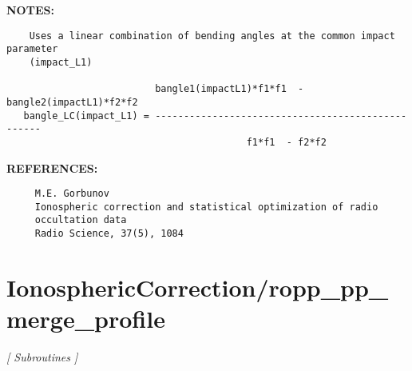 \textbf{NOTES:}\hspace{0.08in}\begin{Verbatim}
    Uses a linear combination of bending angles at the common impact parameter
    (impact_L1)
                        
                          bangle1(impactL1)*f1*f1  - bangle2(impactL1)*f2*f2
   bangle_LC(impact_L1) = --------------------------------------------------
                                          f1*f1  - f2*f2
\end{Verbatim}
\textbf{REFERENCES:}\hspace{0.08in}\begin{Verbatim}
     M.E. Gorbunov
     Ionospheric correction and statistical optimization of radio 
     occultation data
     Radio Science, 37(5), 1084
\end{Verbatim}
\section{IonosphericCorrection/ropp\_pp\_merge\_profile}
\textsl{[ Subroutines ]}

